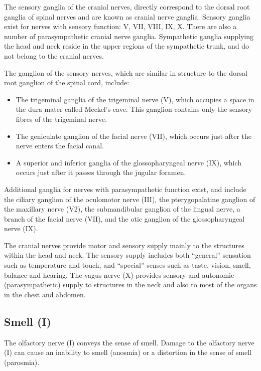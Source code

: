 \documentclass[]{book}
\providecommand{\tightlist}{%
  \setlength{\itemsep}{0pt}\setlength{\parskip}{0pt}}
\begin{document}
The sensory ganglia of the cranial nerves, directly correspond to the dorsal root ganglia of spinal nerves and are known as cranial nerve ganglia. Sensory ganglia exist for nerves with sensory function: V, VII, VIII, IX, X. There are also a number of parasympathetic cranial nerve ganglia. Sympathetic ganglia supplying the head and neck reside in the upper regions of the sympathetic trunk, and do not belong to the cranial nerves.

The ganglion of the sensory nerves, which are similar in structure to the dorsal root ganglion of the spinal cord, include:

\begin{itemize}
\tightlist
\item
  The trigeminal ganglia of the trigeminal nerve (V), which occupies a space in the dura mater called Meckel's cave. This ganglion contains only the sensory fibres of the trigeminal nerve.
\item
  The geniculate ganglion of the facial nerve (VII), which occurs just after the nerve enters the facial canal.
\item
  A superior and inferior ganglia of the glossopharyngeal nerve (IX), which occurs just after it passes through the jugular foramen.
\end{itemize}

Additional ganglia for nerves with parasympathetic function exist, and include the ciliary ganglion of the oculomotor nerve (III), the pterygopalatine ganglion of the maxillary nerve (V2), the submandibular ganglion of the lingual nerve, a branch of the facial nerve (VII), and the otic ganglion of the glossopharyngeal nerve (IX).

The cranial nerves provide motor and sensory supply mainly to the structures within the head and neck. The sensory supply includes both ``general'' sensation such as temperature and touch, and ``special'' senses such as taste, vision, smell, balance and hearing. The vagus nerve (X) provides sensory and autonomic (parasympathetic) supply to structures in the neck and also to most of the organs in the chest and abdomen.

\hypertarget{smell-i}{%
\subsection{Smell (I)}\label{smell-i}}

The olfactory nerve (I) conveys the sense of smell. Damage to the olfactory nerve (I) can cause an inability to smell (anosmia) or a distortion in the sense of smell (parosmia).
\end{document}
